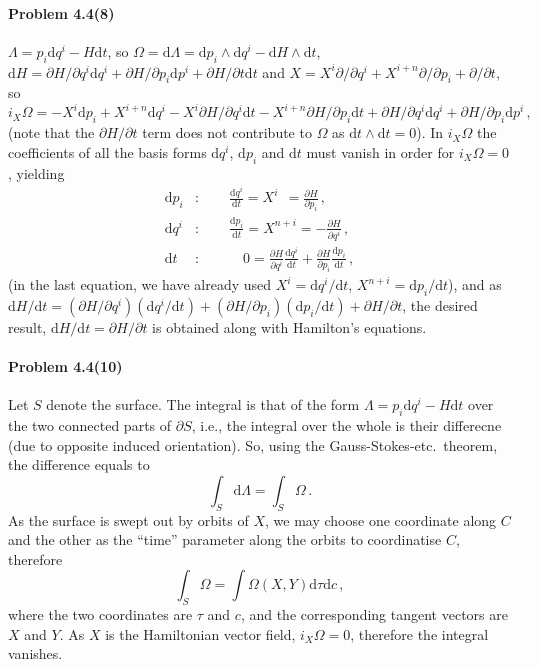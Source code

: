 \documentclass[a4paper,12pt]{article}
\def\d{\mathrm{d}}
\newcommand{\problem}[1]{\paragraph{Problem #1}}
\begin{document}
\problem{4.4(8)} $\Lambda = p_i \d q^i - H \d t$, so $\Omega = \d \Lambda = \d p_i \wedge \d q^i - \d H \wedge \d t$, $\d H = \partial H/\partial q^i \d q^i + \partial H/\partial p_i \d p^i + \partial H/\partial t \d t$ and $X = X^i \partial/\partial q^i + X^{i+n}\partial/\partial p_i + \partial/\partial t$, so
\[
 i_X \Omega = -X^i \d p_i + X^{i+n}\d q^i - X^i \partial H / \partial q^i \d t - X^{i+n}\partial H / \partial p_i \d t + \partial H/\partial q^i \d q^i + \partial H/\partial p_i \d p^i\,,
\]
(note that the $\partial H/\partial t$ term does not contribute to $\Omega$ as $\d t\wedge \d t =0$).
In $i_X \Omega$ the coefficients of all the basis forms $\d q^i$, $\d p_i$ and $\d t$ must vanish in order for $i_X\Omega=0$, yielding
\[
 \begin{aligned}
  \d p_i&:\quad\quad \frac{\d q^i}{\d t} = X^i\ \ = \frac{\partial H}{\partial p_i}\,,\\
  \d q^i&:\quad\quad \frac{\d p_i}{\d t} = X^{n+i} = - \frac{\partial H}{\partial q^i}\,,\\
  \d t\,&:\quad\quad\quad 0= \frac{\partial H}{\partial q^i}\frac{\d q^i}{\d t} + \frac{\partial H}{\partial p_i}\frac{\d p_i}{\d t}\,,
 \end{aligned}
\]
(in the last equation, we have already used $X^i=\d q^i/\d t$, $X^{n+i} = \d p_i/\d t$),
and as $\d H/\d t = (\partial H/\partial q^i) (\d q^i/\d t) + (\partial H/\partial p_i) (\d p_i/\d t) + \partial H/\partial t$, the desired result, $\d H/\d t=\partial H/\partial t$ is obtained along with Hamilton's equations.


\problem{4.4(10)} Let $S$ denote the surface. The integral is that of the form $\Lambda = p_i \d q^i - H\d t$ over the two connected parts of $\partial S$, i.e., the integral over the whole is their differecne (due to opposite induced orientation). So, using the Gauss-Stokes-etc.\ theorem, the difference equals to
\[
 \int_S \d \Lambda = \int_S \Omega\,.
\]
As the surface is swept out by orbits of $X$, we may choose one coordinate along $C$ and the other as the ``time'' parameter along the orbits to coordinatise $C$, therefore
\[
 \int_S \Omega = \int \Omega(X, Y) \d \tau \d c\,,
\]
where the two coordinates are $\tau$ and $c$, and the corresponding tangent vectors are $X$ and $Y$. As $X$ is the Hamiltonian vector field, $i_X\Omega =0$, therefore the integral vanishes.

\end{document}
